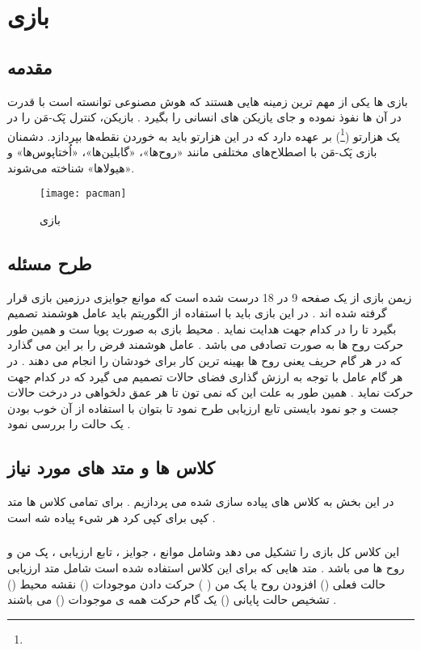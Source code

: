 \chapter{بازی }
\section{مقدمه}
\par
بازی ها یکی از مهم ترین زمینه هایی هستند که هوش مصنوعی توانسته است با قدرت در آن ها نفوذ نموده و جای یازیکن های انسانی را بگیرد . بازیکن، کنترل پَک-مَن را در یک هزارتو (\footnote{}) بر عهده دارد که در این هزارتو باید به خوردن نقطه‌ها بپردازد. دشمنان بازی پَک-مَن با اصطلاح‌های مختلفی مانند «روح‌ها»، «گابلین‌ها»، «اُختاپوس‌ها» و «هیولاها» شناخته می‌شوند.
\begin{figure}[h]
	\texttt{[image: pacman]}
	\centering
	\caption{بازی }
	\cite{NoahWardrip}
	\label{fig2}
\end{figure} 
\section{طرح مسئله}
زیمن بازی از یک صفحه 9 در 18 درست شده است که موانع جوایزی درزمین بازی قرار گرفته شده اند . در این بازی باید با استفاده از الگوریتم 
باید عامل هوشمند تصمیم بگیرد تا 
را در کدام جهت هدایت نماید . محیط بازی به صورت پویا ست و همین طور حرکت روح ها به صورت تصادفی می باشد . عامل هوشمند فرض را بر این می گذارد که در هر گام حریف یعنی روح ها بهینه ترین کار برای خودشان را انجام می دهند . در هر گام عامل با توجه به ارزش گذاری فضای حالات تصمیم می گیرد که در کدام جهت حرکت نماید . همین طور به علت این که نمی تون تا هر عمق دلخواهی در درخت حالات جست و جو نمود بایستی تابع ارزیابی طرح نمود تا بتوان با استفاده از آن خوب بودن یک حالت را بررسی نمود .
\section{کلاس ها و متد های  مورد نیاز}
در این بخش به کلاس های پیاده سازی شده می پردازیم . برای تمامی کلاس ها متد کپی برای کپی کرد هر شیء پیاده شه است .
\subsection{}
این کلاس کل بازی را تشکیل می دهد وشامل موانع ، جوایز ، تابع ارزیابی ، پک من و روح ها می باشد . متد هایی که برای این کلاس استفاده شده است شامل متد ارزیابی حالت فعلی 
()
افزودن روح یا پک من 
(  )
حرکت دادن موجودات
()
نقشه محیط
()
تشخیص حالت پایانی
()
یک گام حرکت همه ی موجودات
()
 می باشند .

